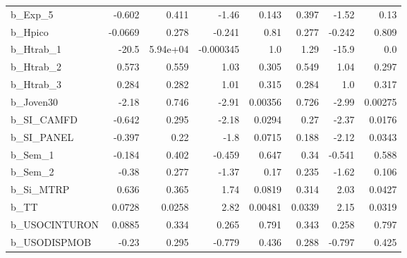 \begin{tabular}{lrrrrrrr}
b\_Exp\_5       &  -0.602 &    0.411 &     -1.46 &    0.143 &         0.397 &        -1.52 &          0.13 \\
b\_Hpico       & -0.0669 &    0.278 &    -0.241 &     0.81 &         0.277 &       -0.242 &         0.809 \\
b\_Htrab\_1     &   -20.5 & 5.94e+04 & -0.000345 &      1.0 &          1.29 &        -15.9 &           0.0 \\
b\_Htrab\_2     &   0.573 &    0.559 &      1.03 &    0.305 &         0.549 &         1.04 &         0.297 \\
b\_Htrab\_3     &   0.284 &    0.282 &      1.01 &    0.315 &         0.284 &          1.0 &         0.317 \\
b\_Joven30     &   -2.18 &    0.746 &     -2.91 &  0.00356 &         0.726 &        -2.99 &       0.00275 \\
b\_SI\_CAMFD    &  -0.642 &    0.295 &     -2.18 &   0.0294 &          0.27 &        -2.37 &        0.0176 \\
b\_SI\_PANEL    &  -0.397 &     0.22 &      -1.8 &   0.0715 &         0.188 &        -2.12 &        0.0343 \\
b\_Sem\_1       &  -0.184 &    0.402 &    -0.459 &    0.647 &          0.34 &       -0.541 &         0.588 \\
b\_Sem\_2       &   -0.38 &    0.277 &     -1.37 &     0.17 &         0.235 &        -1.62 &         0.106 \\
b\_Si\_MTRP     &   0.636 &    0.365 &      1.74 &   0.0819 &         0.314 &         2.03 &        0.0427 \\
b\_TT          &  0.0728 &   0.0258 &      2.82 &  0.00481 &        0.0339 &         2.15 &        0.0319 \\
b\_USOCINTURON &  0.0885 &    0.334 &     0.265 &    0.791 &         0.343 &        0.258 &         0.797 \\
b\_USODISPMOB  &   -0.23 &    0.295 &    -0.779 &    0.436 &         0.288 &       -0.797 &         0.425 \\
\bottomrule
\end{tabular}

